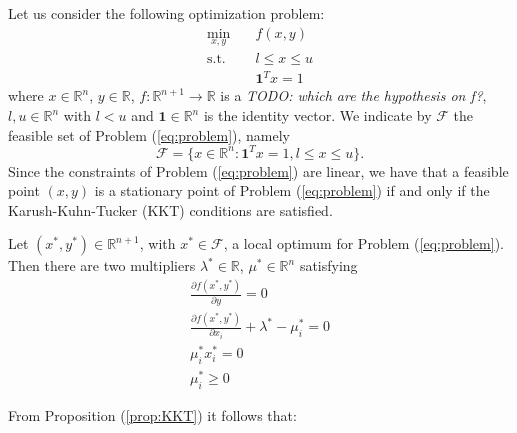 Let us consider the following optimization problem:
\begin{subequations}\label{eq:problem} 
\begin{align}
\min_{x,y} & \quad f(x,y)  \\
\text{s.t.} & \quad l \leq x \leq u \\
& \quad \mathbf{1}^T x = 1 
\end{align}
\end{subequations}
where $x \in \mathbb{R}^n$, $y \in \mathbb{R}$, $f:\mathbb{R}^{n+1} \rightarrow \mathbb{R}$ is a \textit{TODO: which are the hypothesis on f?}, $l, u \in \mathbb{R}^n$ with $l < u$ and $\mathbf{1} \in \mathbb{R}^n$ is the identity vector. We indicate by $\mathcal{F}$ the feasible set of Problem (\ref{eq:problem}), namely
\begin{equation}
\mathcal{F} = \{x \in \mathbb{R}^n : \mathbf{1}^T x = 1, l \leq x \leq u\}.
\end{equation}
Since the constraints of Problem (\ref{eq:problem}) are linear, we have that a feasible point $(x,y)$ is a stationary point of Problem (\ref{eq:problem}) if and only if the Karush-Kuhn-Tucker (KKT) conditions are satisfied.

\begin{proposition}\label{prop:KKT}
Let $(x^*,y^*) \in \mathbb{R}^{n+1}$, with $x^* \in \mathcal{F}$, a local optimum for Problem (\ref{eq:problem}). Then there are two multipliers $\lambda^* \in \mathbb{R}$, $\mu^* \in \mathbb{R}^n$ satisfying
\begin{subequations}
\begin{align}
\frac{\partial f(x^*, y^*)}{\partial y} = 0 \\
\frac{\partial f(x^*, y^*)}{\partial x_i} +\lambda^* - \mu^*_i =0 \\
\mu^*_ix^{*}_i=0 \\
\mu^*_i\ge0
\end{align}
\end{subequations}
\end{proposition}

\hspace{-1.8em} From Proposition (\ref{prop:KKT}) it follows that:

